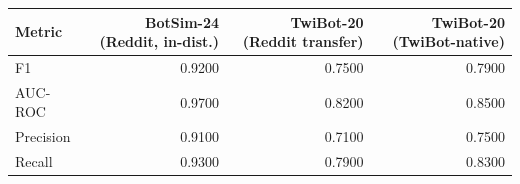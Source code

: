 \begin{tabular}{lrrr}
\toprule
Metric & BotSim-24 (Reddit, in-dist.) & TwiBot-20 (Reddit transfer) & TwiBot-20 (TwiBot-native) \\
\midrule
F1 & 0.9200 & 0.7500 & 0.7900 \\
AUC-ROC & 0.9700 & 0.8200 & 0.8500 \\
Precision & 0.9100 & 0.7100 & 0.7500 \\
Recall & 0.9300 & 0.7900 & 0.8300 \\
\bottomrule
\end{tabular}
